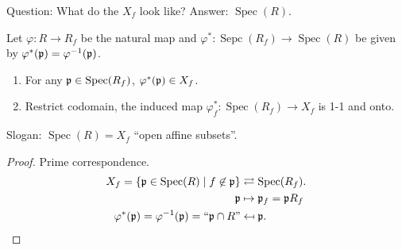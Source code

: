 \begin{remark}
    Question: What do the $X_f$ look like? Answer: $\operatorname{Spec}(R)$.
\end{remark}

\begin{proposition}
    Let $\varphi: R \to R_f$ be the natural map and $\varphi^*: \operatorname{Sepc}(R_f) \to \operatorname{Spec}(R)$ be given by $\varphi^*(\mathfrak{p}) = \varphi^{-1}(\mathfrak{p})$.
    \begin{enumerate}
        \item For any $\mathfrak{p} \in \operatorname{Spec}(R_f)$, $\varphi^*(\mathfrak{p}) \in X_f$.
        \item Restrict codomain, the induced map $\varphi_f^*: \operatorname{Spec}(R_f) \to X_f$ is 1-1 and onto.
    \end{enumerate}
    Slogan: $\operatorname{Spec}(R) = X_f$ ``open affine subsets''.
\end{proposition}

\begin{proof}
    Prime correspondence.
    \begin{align*}
        X_f = \{\mathfrak{p} \in \operatorname{Spec}(R) \mid f \not \in \mathfrak{p}\} & \rightleftarrows \operatorname{Spec}(R_f). \\
        \mathfrak{p} &\mapsto \mathfrak{p}_f = \mathfrak{p} R_f \\
        \varphi^*(\mathfrak{p}) = \varphi^{-1}(\mathfrak{p}) = \text{``$\mathfrak{p} \cap R$''} &\mapsfrom \mathfrak{p}.
    \end{align*}
\end{proof}

